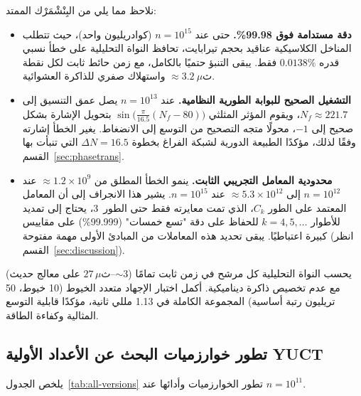 \documentclass[11pt,a4paper]{article}
\begin{document}
	نلاحظ مما يلي من البِنْشْمَرْك الممتد:
	
	\begin{itemize}
		\item \textbf{دقة مستدامة فوق 99.98\%.}
		حتى عند \(n = 10^{15}\) (كوادريليون واحد)، حيث تتطلب المناخل الكلاسيكية
		عناقيد بحجم تيرابايت، تحافظ النواة التحليلية على خطأ نسبي قدره
		\(0.0138\%\) فقط. يبقى التنبؤ حتميًا بالكامل، مع زمن حائط ثابت لكل نقطة
		\(\approx 3.2\ \mu\text{ث}\) واستهلاك صفري للذاكرة العشوائية.
		
		\item \textbf{التشغيل الصحيح للبوابة الطورية النظامية.}
		عند \(n = 10^{13}\) يصل عمق التنسيق إلى \(N_f \approx 221.7\)،
		ويقوم المؤثر المثلثي \(\sin\!\bigl(\frac{\pi}{16.5}(N_f-80)\bigr)\)
		بتحويل الإشارة بشكل صحيح إلى \(-1\)، محولًا متجه التصحيح من التوسع
		إلى الانضغاط. يغير الخطأ إشارته وفقًا لذلك، مؤكدًا الطبيعة الدورية
		لشبكة الفراغ بخطوة \(\Delta N = 16.5\) التي تنبأت بها القسم~\ref{sec:phasetrans}.
		
		\item \textbf{محدودية المعامل التجريبي الثابت.}
		ينمو الخطأ المطلق من \(\approx 1.2\times 10^{9}\) عند
		\(n = 10^{12}\) إلى \(\approx 5.3\times 10^{12}\) عند
		\(n = 10^{15}\). يشير هذا الانجراف إلى أن المعامل المعتمد على الطور
		\(C_k\)، الذي تمت معايرته فقط حتى الطور~3، يحتاج إلى تمديد للأطوار
		\(k = 4, 5, \dots\) للحفاظ على دقة "تسع خمسات" (99.999\%) على مقاييس
		كبيرة اعتباطيًا. يبقى تحديد هذه المعاملات من المبادئ الأولى مهمة مفتوحة
		(انظر القسم~\ref{sec:discussion}).
	\end{itemize}
	
	يحسب النواة التحليلية كل مرشح في زمن ثابت تمامًا (\(\sim 3\)--\(27\,\mu\text{ث}\) على معالج حديث) مع عدم تخصيص ذاكرة ديناميكية. أكمل اختبار الإجهاد متعدد الخيوط (10 خيوط، 50 تريليون رتبة أساسية) المجموعة الكاملة في 1.13 مللي ثانية، مؤكدًا قابلية التوسع المثالية وكفاءة الطاقة.
	
	\subsection{تطور خوارزميات البحث عن الأعداد الأولية YUCT}
	يلخص الجدول~\ref{tab:all-versions} تطور الخوارزميات وأدائها عند \(n=10^{11}\).
	
\end{document}
